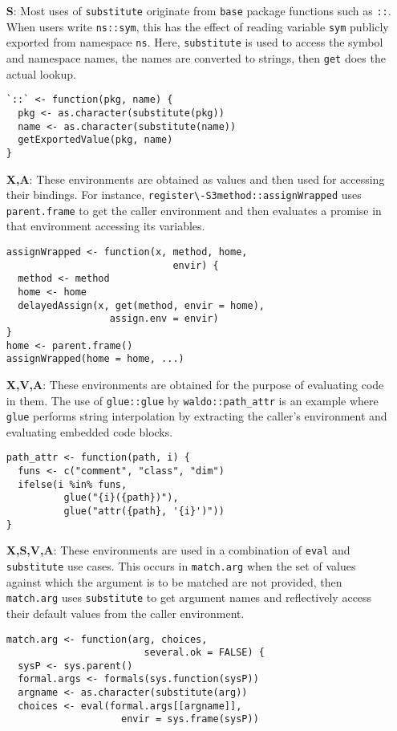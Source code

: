 \documentclass[10pt,sigplan,authorversion=true]{acmart}
\renewcommand{\c}[1]{\lstinline |#1|\xspace}
\newcommand{\base}{\c{base}}
\newcommand{\eval}{\c{eval}}
\newcommand{\substitute}{\c{substitute}}
\begin{document}
\begin{itemize}
\item[{\bf S}:] Most uses of \c{substitute} originate from \base package
  functions such as \c{::}. When users write \c{ns::sym}, this has the effect of
  reading variable \c{sym} publicly exported from namespace \c{ns}. Here,
  \substitute is used to access the symbol and namespace names, the names are
  converted to strings, then \c{get} does the actual lookup.

\begin{lstlisting}
`::` <- function(pkg, name) {
  pkg <- as.character(substitute(pkg))
  name <- as.character(substitute(name))
  getExportedValue(pkg, name)
}
\end{lstlisting}\medskip

\item[{\bf X,A}:] These environments are obtained as values and then used for
  accessing their bindings. For instance, \c{register\-S3method::assignWrapped}
  uses \c{parent.frame} to get the caller environment and then evaluates a
  promise in that environment accessing its variables.

\begin{lstlisting}
assignWrapped <- function(x, method, home,
                             envir) {
  method <- method
  home <- home
  delayedAssign(x, get(method, envir = home),
                  assign.env = envir)
}
home <- parent.frame()
assignWrapped(home = home, ...)
\end{lstlisting}\medskip

\item[{\bf X,V,A}:] These environments are obtained for the purpose of
  evaluating code in them. The use of \c{glue::glue} by \c{waldo::path_attr} is
  an example where \c{glue} performs string interpolation by extracting the
  caller's environment and evaluating embedded code blocks.

\begin{lstlisting}
path_attr <- function(path, i) {
  funs <- c("comment", "class", "dim")
  ifelse(i %in% funs,
          glue("{i}({path})"),
          glue("attr({path}, '{i}')"))
}
\end{lstlisting}\medskip

\item[{\bf X,S,V,A}:] These environments are used in a combination of \eval and
  \substitute use cases. This occurs in \c{match.arg} when the set of values
  against which the argument is to be matched are not provided, then
  \c{match.arg} uses \c{substitute} to get argument names and reflectively
  access their default values from the caller environment.

\begin{lstlisting}
match.arg <- function(arg, choices,
                        several.ok = FALSE) {
  sysP <- sys.parent()
  formal.args <- formals(sys.function(sysP))
  argname <- as.character(substitute(arg))
  choices <- eval(formal.args[[argname]], 
                    envir = sys.frame(sysP))
\end{lstlisting}\medskip

\end{itemize}
\end{document}
